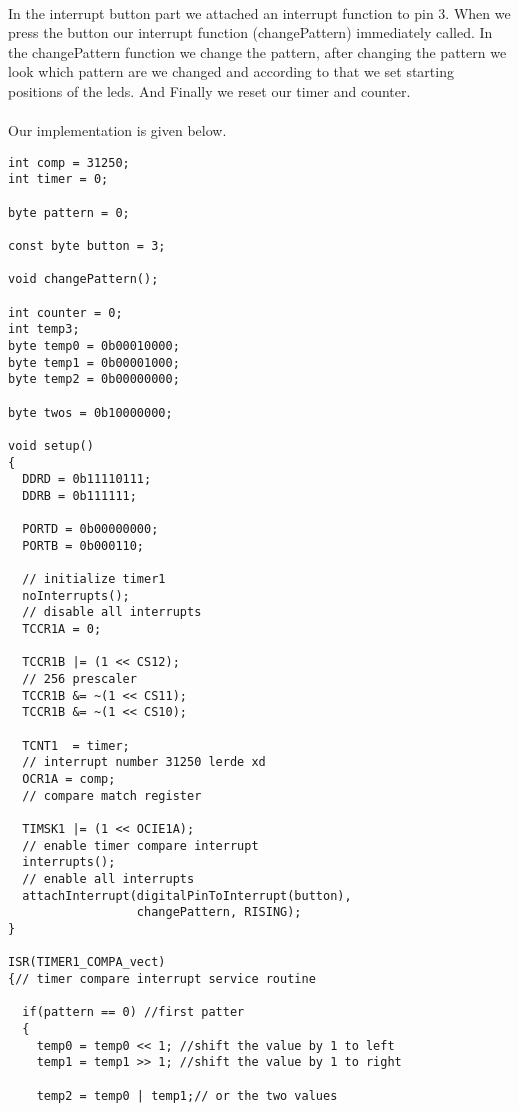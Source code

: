 \documentclass[pdftex,12pt,a4paper]{article}
\begin{document}
\begin{flushleft}
\paragraph{}
In the interrupt button part we attached an interrupt function to pin 3. When we press the button our interrupt function (changePattern) immediately called. In the changePattern function we change the pattern, after changing the pattern we look which pattern are we changed and according to that we set starting positions of the leds. And Finally we reset our timer and counter.
 
\paragraph{}
Our implementation is given below.
\begin{lstlisting}[style={Arduino}]
int comp = 31250;
int timer = 0;

byte pattern = 0;

const byte button = 3;

void changePattern();

int counter = 0;
int temp3;
byte temp0 = 0b00010000;
byte temp1 = 0b00001000;  
byte temp2 = 0b00000000;

byte twos = 0b10000000;

void setup()
{
  DDRD = 0b11110111;
  DDRB = 0b111111;
  
  PORTD = 0b00000000;
  PORTB = 0b000110;
 
  // initialize timer1 
  noInterrupts();           
  // disable all interrupts
  TCCR1A = 0;
  
  TCCR1B |= (1 << CS12);    
  // 256 prescaler
  TCCR1B &= ~(1 << CS11);
  TCCR1B &= ~(1 << CS10);
    
  TCNT1  = timer;
  // interrupt number 31250 lerde xd
  OCR1A = comp;           
  // compare match register
  
  TIMSK1 |= (1 << OCIE1A);  
  // enable timer compare interrupt
  interrupts();             
  // enable all interrupts
  attachInterrupt(digitalPinToInterrupt(button), 
                  changePattern, RISING);  
}

ISR(TIMER1_COMPA_vect)
{// timer compare interrupt service routine
  
  if(pattern == 0) //first patter
  {
    temp0 = temp0 << 1;	//shift the value by 1 to left
    temp1 = temp1 >> 1; //shift the value by 1 to right
    
    temp2 = temp0 | temp1;// or the two values


\end{lstlisting}
\end{flushleft}
\end{document}
